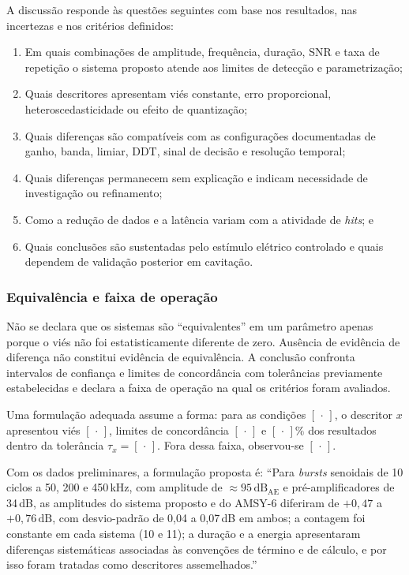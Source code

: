 A discussão responde às questões seguintes com base nos resultados, nas incertezas e nos critérios definidos:
\begin{enumerate}
	\item Em quais combinações de amplitude, frequência, duração, SNR e taxa de repetição o sistema proposto atende aos limites de detecção e parametrização;
	
	\item Quais descritores apresentam viés constante, erro proporcional, heteroscedasticidade ou efeito de quantização;
	
	\item Quais diferenças são compatíveis com as configurações documentadas de ganho, banda, limiar, DDT, sinal de decisão e resolução temporal;
	
	\item Quais diferenças permanecem sem explicação e indicam necessidade de investigação ou refinamento;
	
	\item Como a redução de dados e a latência variam com a atividade de \textit{hits}; e
	
	\item Quais conclusões são sustentadas pelo estímulo elétrico controlado e quais dependem de validação posterior em cavitação.
\end{enumerate}

\subsubsection{Equivalência e faixa de operação}
Não se declara que os sistemas são ``equivalentes'' em um parâmetro apenas porque o viés não foi estatisticamente diferente de zero. Ausência de evidência de diferença não constitui evidência de equivalência. A conclusão confronta intervalos de confiança e limites de concordância com tolerâncias previamente estabelecidas e declara a faixa de operação na qual os critérios foram avaliados.

Uma formulação adequada assume a forma: para as condições \( [\,\cdot\,] \), o descritor \(x\) apresentou viés \([\,\cdot\,]\), limites de concordância \([\,\cdot\,]\) e \([\,\cdot\,]\%\) dos resultados dentro da tolerância \(\tau_x=[\,\cdot\,]\). Fora dessa faixa, observou-se \([\,\cdot\,]\).

Com os dados preliminares, a formulação proposta é: ``Para \textit{bursts} senoidais de 10 ciclos a 50, 200 e 450\,kHz, com amplitude de \(\approx 95\,\mathrm{dB}_{\mathrm{AE}}\) e pré-amplificadores de 34\,dB, as amplitudes do sistema proposto e do AMSY-6 diferiram de \(+0{,}47\) a \(+0{,}76\,\mathrm{dB}\), com desvio-padrão de 0,04 a 0,07\,dB em ambos; a contagem foi constante em cada sistema (10 e 11); a duração e a energia apresentaram diferenças sistemáticas associadas às convenções de término e de cálculo, e por isso foram tratadas como descritores assemelhados.''

